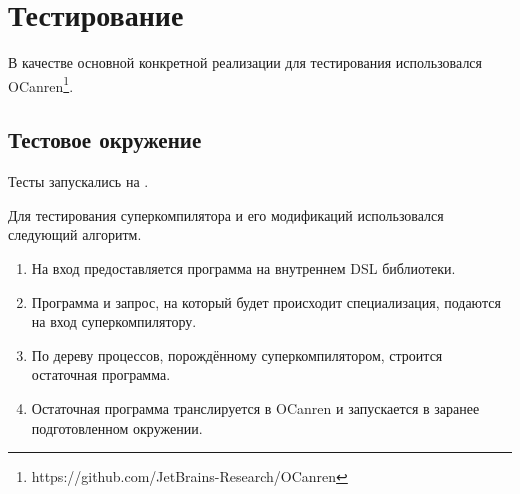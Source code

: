 \section{Тестирование}

В качестве основной конкретной реализации \ukanren для тестирования
использовался OCanren\footnote{https://github.com/JetBrains-Research/OCanren}\cite{ocanren}.

\subsection{Тестовое окружение}

Тесты запускались на .

Для тестирования суперкомпилятора и его модификаций использовался следующий алгоритм.
\begin{enumerate}
\item На вход предоставляется программа на внутреннем DSL \ukanren библиотеки.
\item Программа и запрос, на который будет происходит специализация, подаются на вход суперкомпилятору.
\item По дереву процессов, порождённому суперкомпилятором, строится остаточная программа.
\item Остаточная программа транслируется в OCanren и запускается в заранее подготовленном окружении.
\end{enumerate}

